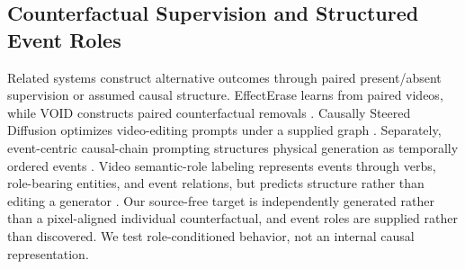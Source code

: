 \subsection{Counterfactual Supervision and Structured Event Roles}
\label{subsec:related-counterfactual}

Related systems construct alternative outcomes through paired present/absent
supervision or assumed causal structure.  EffectErase learns from paired
videos, while VOID constructs paired counterfactual removals
\citep{fu2026effecterase,motamed2026void}.  Causally Steered Diffusion optimizes
video-editing prompts under a supplied graph \citep{spyrou2025causally}.
Separately, event-centric causal-chain prompting structures physical
generation as temporally ordered events \citep{wang2026chain}.  Video
semantic-role labeling represents events through verbs, role-bearing entities,
and event relations, but predicts structure rather than editing a generator
\citep{sadhu2021vidsrl}.  Our source-free target is independently generated
rather than a pixel-aligned individual counterfactual, and event roles are
supplied rather than discovered.  We test role-conditioned behavior, not an
internal causal representation.
